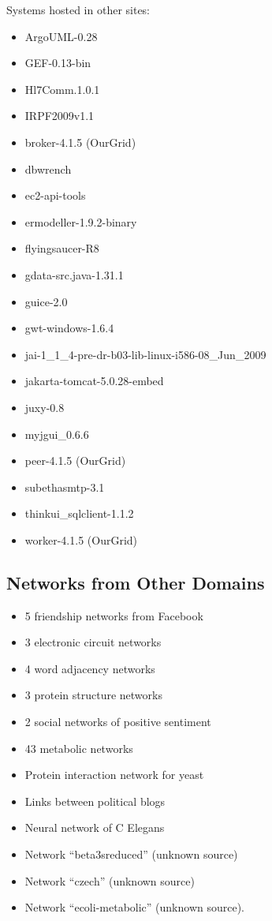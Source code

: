 Systems hosted in other sites:

\begin{itemize}
\item ArgoUML-0.28
\item GEF-0.13-bin
\item Hl7Comm.1.0.1
\item IRPF2009v1.1
\item broker-4.1.5 (OurGrid)
\item dbwrench
\item ec2-api-tools
\item ermodeller-1.9.2-binary
\item flyingsaucer-R8
\item gdata-src.java-1.31.1
\item guice-2.0
\item gwt-windows-1.6.4
\item jai-1\_1\_4-pre-dr-b03-lib-linux-i586-08\_Jun\_2009
\item jakarta-tomcat-5.0.28-embed
\item juxy-0.8
\item myjgui\_0.6.6
\item peer-4.1.5 (OurGrid)
\item subethasmtp-3.1
\item thinkui\_sqlclient-1.1.2
\item worker-4.1.5 (OurGrid)
\end{itemize}

\subsection{Networks from Other Domains}

\begin{itemize}
\item 5 friendship networks from Facebook \cite{Traud2008}
\item 3 electronic circuit networks \cite{Milo2004}
\item 4 word adjacency networks \cite{Milo2004}
\item 3 protein structure networks \cite{Milo2004}
\item 2 social networks of positive sentiment \cite{Milo2004}
\item 43 metabolic networks \cite{Jeong2000}
\item Protein interaction network for yeast \cite{Jeong2001}
\item Links between political blogs \cite{Adamic2005}
\item Neural network of C Elegans \cite{Watts1998}
\item Network ``beta3sreduced'' (unknown source)
\item Network ``czech'' (unknown source)
\item Network ``ecoli-metabolic'' (unknown source).
\end{itemize}

